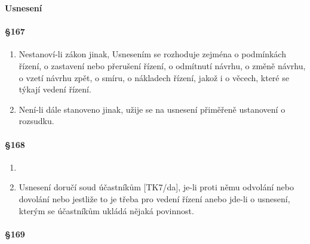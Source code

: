 \textbf{\Large Usnesení}

\paragraph{\S 167}

\begin{enumerate}[label={(\arabic*)}]
  \item Nestanoví-li zákon jinak,  Usnesením se rozhoduje zejména o podmínkách řízení, o zastavení nebo přerušení řízení, o odmítnutí návrhu, o změně návrhu, o vzetí návrhu zpět, o smíru, o nákladech řízení, jakož i o věcech, které se týkají vedení řízení.
  \item Není-li dále stanoveno jinak, užije se na usnesení přiměřeně ustanovení o rozsudku.
\end{enumerate}

\paragraph{\S 168}

\begin{enumerate}[label={(\arabic*)}]
  \item {}
  \item Usnesení doručí soud účastníkům [TK7/da], je-li proti němu odvolání nebo dovolání nebo jestliže to je třeba pro vedení řízení anebo jde-li o usnesení, kterým se účastníkům ukládá nějaká povinnost.
\end{enumerate}

\paragraph{\S 169}

